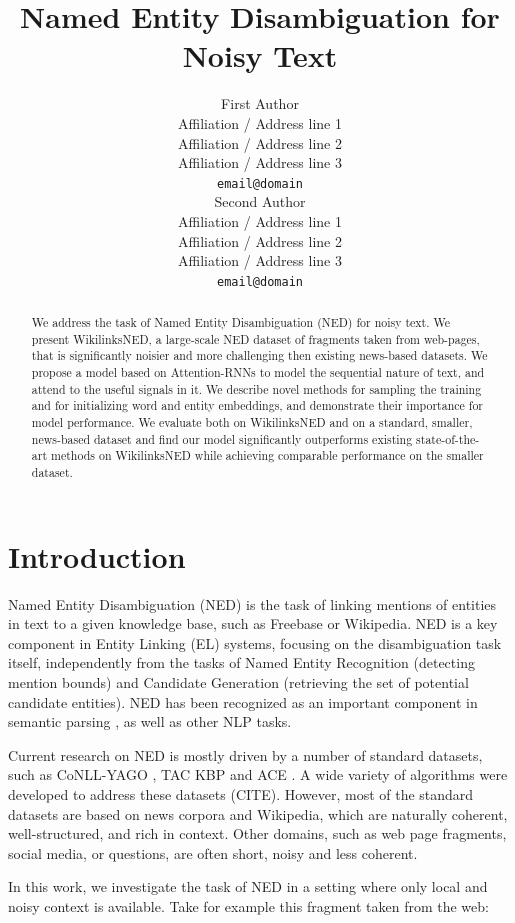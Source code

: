 \documentclass[11pt]{article}
\title{Named Entity Disambiguation for Noisy Text}
\author{First Author \\
	Affiliation / Address line 1 \\
	Affiliation / Address line 2 \\
	Affiliation / Address line 3 \\
	{\tt email@domain} \\\And
	Second Author \\
	Affiliation / Address line 1 \\
	Affiliation / Address line 2 \\
	Affiliation / Address line 3 \\
	{\tt email@domain} \\}
\date{}
\begin{document}
	\maketitle
	\begin{abstract}
		We address the task of Named Entity Disambiguation (NED) for noisy text. 
		We present WikilinksNED, a large-scale NED dataset of fragments taken from web-pages, that is significantly noisier and more challenging then existing news-based datasets.
		We propose a model based on Attention-RNNs to model the sequential nature of text, and attend to the useful signals in it.
		We describe novel methods for sampling the training and for initializing word and entity embeddings, and demonstrate their importance for model performance.
		We evaluate both on WikilinksNED and on a standard, smaller, news-based dataset and find our model significantly outperforms existing state-of-the-art methods on WikilinksNED while achieving comparable performance on the smaller dataset. 
	\end{abstract}
	
	
	
	\section{Introduction}
			
	Named Entity Disambiguation (NED) is the task of linking mentions of entities in text to a given knowledge base, such as Freebase or Wikipedia. NED is a key component in Entity Linking (EL) systems, focusing on the disambiguation task itself, independently from the tasks of Named Entity Recognition (detecting mention bounds) and Candidate Generation (retrieving the set of potential candidate entities). NED has been recognized as an important component in semantic parsing \cite{berant2013semantic}, as well as other NLP tasks.
		
	Current research on NED is mostly driven by a number of standard datasets, such as CoNLL-YAGO \cite{hoffart2011robust}, TAC KBP \cite{ji2010overview} and ACE \cite{bentivogli2010extending}. A wide variety of algorithms were developed to address these datasets (CITE). However, most of the standard datasets are based on news corpora and Wikipedia, which are naturally coherent, well-structured, and rich in context. Other domains, such as web page fragments, social media, or questions, are often short, noisy and less coherent. 
	
	In this work, we investigate the task of NED in a setting where only local and noisy context is available. Take for example this fragment taken from the web:
	
\end{document}
